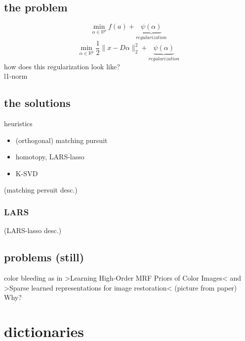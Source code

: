 \subsection{the problem}
\begin{frame}
\[ 
\min_{\alpha\in\mathbb{R}^{p}} f(a) + \underbrace{\psi(\alpha)}_{regularization} 
\]
\[
\min_{\alpha\in\mathbb{R}^{p}} \frac{1}{2} \lVert x - D\alpha \rVert^{2}_{2} + \underbrace{\psi(\alpha)}_{regularization}
\] 
how does this regularization look like? \\
l1-norm

\end{frame}

\subsection{the solutions}
\begin{frame}
heuristics 
\begin{itemize}
\item (orthogonal) matching pursuit
\item homotopy, LARS-lasso
\item K-SVD
\end{itemize}
\end{frame}


\begin{frame}
(matching persuit desc.)
\end{frame}

\subsubsection*{LARS}
\begin{frame}
(LARS-lasso desc.)
\end{frame}


\subsection{problems (still)}
\begin{frame}
color bleeding as in >Learning High-Order MRF Priors of Color Images< and >Sparse learned representations for image restoration<
(picture from paper)
Why?
\end{frame}

\section{dictionaries}
